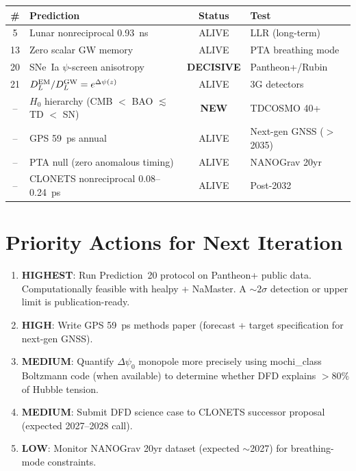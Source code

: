\documentclass[11pt,a4paper]{article}
\newcommand{\Dpsi}{\Delta\psi}
\begin{document}
\begin{center}
\begin{longtable}{clcl}
\toprule
\textbf{\#} & \textbf{Prediction} & \textbf{Status} & \textbf{Test} \\
\midrule
\endhead
5 & Lunar nonreciprocal 0.93~ns & ALIVE & LLR (long-term) \\
13 & Zero scalar GW memory & ALIVE & PTA breathing mode \\
20 & SNe~Ia $\psi$-screen anisotropy & \textbf{DECISIVE} & Pantheon+/Rubin \\
21 & $D_L^{\rm EM}/D_L^{\rm GW} = e^{\Dpsi(z)}$ & ALIVE & 3G detectors \\
-- & $H_0$ hierarchy (CMB $<$ BAO $\lesssim$ TD $<$ SN) & \textbf{NEW} & TDCOSMO 40+ \\
-- & GPS 59~ps annual & ALIVE & Next-gen GNSS ($>$2035) \\
-- & PTA null (zero anomalous timing) & ALIVE & NANOGrav 20yr \\
-- & CLONETS nonreciprocal 0.08--0.24~ps & ALIVE & Post-2032 \\
\bottomrule
\end{longtable}
\end{center}


\section*{Priority Actions for Next Iteration}

\begin{enumerate}[nosep]
\item \textbf{HIGHEST}: Run Prediction~20 protocol on Pantheon+
  public data.  Computationally feasible with healpy + NaMaster.
  A $\sim 2\sigma$ detection or upper limit is publication-ready.
\item \textbf{HIGH}: Write GPS 59~ps methods paper (forecast +
  target specification for next-gen GNSS).
\item \textbf{MEDIUM}: Quantify $\Dpsi_0$ monopole more precisely
  using mochi\_class Boltzmann code (when available) to determine
  whether DFD explains $> 80\%$ of Hubble tension.
\item \textbf{MEDIUM}: Submit DFD science case to CLONETS successor
  proposal (expected 2027--2028 call).
\item \textbf{LOW}: Monitor NANOGrav 20yr dataset (expected $\sim$2027)
  for breathing-mode constraints.
\end{enumerate}
\end{document}
